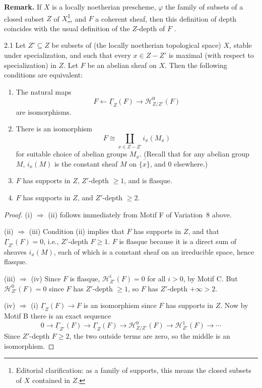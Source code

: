 \par\medskip\noindent\textbf{Remark.}
If $X$ is a locally noetherian prescheme, $\varphi$ the family of subsets of a closed subset $Z$ of $X$\footnote{Editorial clarification: as a family of supports, this means the closed subsets of $X$ contained in $Z$.}, and $F$ a coherent sheaf, then this definition of depth coincides with the usual definition of the $Z$-depth of $F$ \cite[]{LC}.
\par\medskip

\begin{bookproposition}{2.1}\label{prop:4.2.1}
Let $Z'\subseteq Z$ be subsets of (the locally noetherian topological space) $X$, stable under specialization, and such that every $x\in Z-Z'$ is maximal (with respect to specialization) in $Z$. Let $F$ be an abelian sheaf on $X$. Then the following conditions are equivalent:
\begin{enumerate}
\item[(i)] The natural maps
\[
F\longleftarrow \underline{\Gamma}_{Z}(F)\longrightarrow \mathcal{H}_{Z/Z'}^{0}(F)
\]
are isomorphisms.
\item[(ii)] There is an isomorphism
\[
F\cong \coprod_{x\in Z-Z'} i_x(M_x)
\]
for suitable choice of abelian groups $M_x$. (Recall that for any abelian group $M$, $i_x(M)$ is the constant sheaf $M$ on $\overline{\{x\}}$, and $0$ elsewhere.)
\item[(iii)] $F$ has supports in $Z$, $Z'$-depth $\geq 1$, and is flasque.
\item[(iv)] $F$ has supports in $Z$, and $Z'$-depth $\geq 2$.
\end{enumerate}
\end{bookproposition}

\begin{proof}
(i) $\Longrightarrow$ (ii) follows immediately from Motif F of Variation~8 above.

(ii) $\Longrightarrow$ (iii) Condition (ii) implies that $F$ has supports in $Z$, and that $\underline{\Gamma}_{Z'}(F)=0$, i.e., $Z'$-depth $F\geq 1$. $F$ is flasque because it is a direct sum of sheaves $i_x(M)$, each of which is a constant sheaf on an irreducible space, hence flasque.

(iii) $\Longrightarrow$ (iv) Since $F$ is flasque, $\mathcal{H}_{Z'}^{i}(F)=0$ for all $i>0$, by Motif C. But $\mathcal{H}_{Z'}^{0}(F)=0$ since $F$ has $Z'$-depth $\geq 1$, so $F$ has $Z'$-depth $+\infty > 2$.

(iv) $\Longrightarrow$ (i) $\underline{\Gamma}_Z(F)\to F$ is an isomorphism since $F$ has supports in $Z$. Now by Motif B there is an exact sequence
\[
0\longrightarrow \underline{\Gamma}_{Z'}(F)\longrightarrow \underline{\Gamma}_{Z}(F)\longrightarrow \mathcal{H}_{Z/Z'}^{0}(F)\longrightarrow \mathcal{H}_{Z'}^{1}(F)\longrightarrow\cdots
\]
Since $Z'$-depth $F\geq 2$, the two outside terms are zero, so the middle is an isomorphism.
\end{proof}

